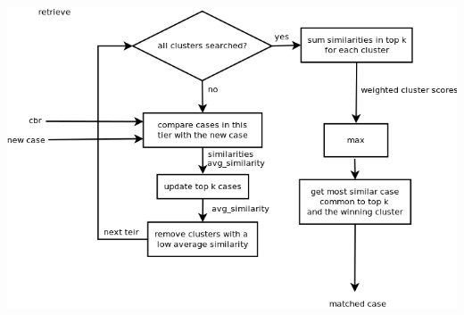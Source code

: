 \documentclass[11pt]{article}
\begin{document}
\begin{itemize}
\begin{itemize}
\includegraphics[width=\linewidth]{retrieve.png}

\end{itemize}
\end{itemize}
\end{document}
